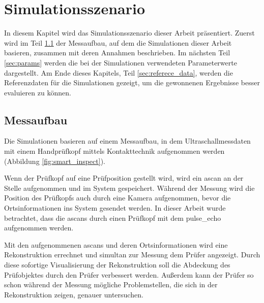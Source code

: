 \chapter{Simulationsszenario} \label{chap:scenario}
In diesem Kapitel wird das Simulationsszenario dieser Arbeit präsentiert. Zuerst wird im Teil \ref{sec:smartinspect} der Messaufbau, auf dem die Simulationen dieser Arbeit basieren, zusammen mit deren Annahmen beschrieben. Im nächsten Teil \ref{sec:params} werden die bei der Simulationen verwendeten Parameterwerte dargestellt. Am Ende dieses Kapitels, Teil \ref{sec:referece_data}, werden die Referenzdaten für die Simulationen gezeigt, um die gewonnenen Ergebnisse besser evaluieren zu können.

\section{Messaufbau} \label{sec:smartinspect}

Die Simulationen basieren auf einem Messaufbau, in dem Ultraschallmessdaten mit einem Handprüfkopf mittels Kontakttechnik aufgenommen werden (Abbildung \ref{fig:smart_inspect}). \par
Wenn der Prüfkopf auf eine Prüfposition gestellt wird, wird ein \gls{ascan} an der Stelle aufgenommen und im System gespeichert. Während der Messung wird die Position des Prüfkopfs auch durch eine Kamera aufgenommen, bevor die Ortsinformationen ins System gesendet werden. In dieser Arbeit wurde betrachtet, dass die \glspl{ascan} durch einen Prüfkopf mit dem \gls{pulse_echo} aufgenommen werden. \par 
Mit den aufgenommenen \glspl{ascan} und deren Ortsinformationen wird eine Rekonstruktion errechnet und simultan zur Messung dem Prüfer angezeigt. Durch diese sofortige Visualisierung der Rekonstruktion soll die Abdeckung des Prüfobjektes durch den Prüfer verbessert werden. Außerdem kann der Prüfer so schon während der Messung mögliche Problemstellen, die sich in der Rekonstruktion zeigen, genauer untersuchen.


